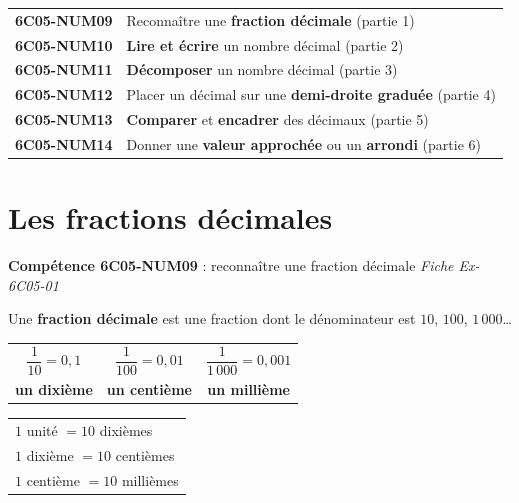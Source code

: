 \documentclass[11pt]{article}
\newcommand{\comp}[2]{\par\smallskip\noindent\colorbox{gray!15}{\parbox{\dimexpr\linewidth-2\fboxsep}{\small\textbf{Compétence #1} : #2}}\par\smallskip}
\newcommand{\f}[2]{\dfrac{#1}{#2}}
\newif\ifve \ifdefined\versioneleve\vetrue\fi
\begin{document}
\ifve\else
\begin{tcolorbox}[colback=white,colframe=black,boxrule=0.6pt,arc=2mm,title={\textbf{Ce que je dois savoir faire à la fin du chapitre}},coltitle=black,colbacktitle=gray!15]
\begin{tabular}{@{}ll@{}}
\textbf{6C05-NUM09} & Reconnaître une \textbf{fraction décimale} \hfill (partie 1)\\
\textbf{6C05-NUM10} & \textbf{Lire et écrire} un nombre décimal \hfill (partie 2)\\
\textbf{6C05-NUM11} & \textbf{Décomposer} un nombre décimal \hfill (partie 3)\\
\textbf{6C05-NUM12} & Placer un décimal sur une \textbf{demi-droite graduée} \hfill (partie 4)\\
\textbf{6C05-NUM13} & \textbf{Comparer} et \textbf{encadrer} des décimaux \hfill (partie 5)\\
\textbf{6C05-NUM14} & Donner une \textbf{valeur approchée} ou un \textbf{arrondi} \hfill (partie 6)\\
\end{tabular}
\end{tcolorbox}

\section{Les fractions décimales}
\comp{6C05-NUM09}{reconnaître une fraction décimale \hfill \textit{Fiche Ex-6C05-01}}

\begin{definition}
Une \textbf{fraction décimale} est une fraction dont le dénominateur est $10$, $100$, $1\,000$\ldots
\end{definition}

\begin{center}
\renewcommand{\arraystretch}{1.6}
\begin{tabular}{|c|c|c|}
\hline
$\f{1}{10} = 0,1$ & $\f{1}{100} = 0,01$ & $\f{1}{1\,000} = 0,001$ \\
\textbf{un dixième} & \textbf{un centième} & \textbf{un millième} \\ \hline
\end{tabular}
\qquad
\begin{tabular}{l}
$1$ unité $= 10$ dixièmes\\
$1$ dixième $= 10$ centièmes\\
$1$ centième $= 10$ millièmes
\end{tabular}
\end{center}
\end{document}
